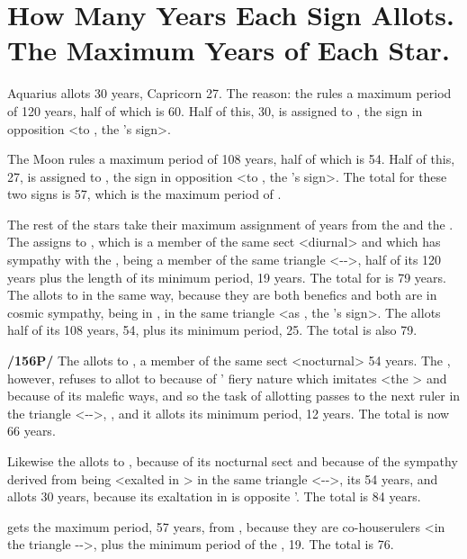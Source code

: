 \section{How Many Years Each Sign Allots. The Maximum Years of Each Star.}

Aquarius allots 30 years, Capricorn 27. The reason: the \Sun\xspace rules a maximum period of 120 years,
half of which is 60. Half of this, 30, is assigned to \Aquarius, the sign in opposition <to \Leo, the \Sun’s
sign>. 

The Moon rules a maximum period of 108 years, half of which is 54. Half of this, 27, is assigned to \Capricorn, the sign in opposition <to \Cancer, the \Moon’s sign>. The total for these two signs is 57, which is the maximum period of \Saturn.

The rest of the stars take their maximum assignment of years from the \Sun\xspace and the \Moon. The \Sun\xspace assigns to \Jupiter, which is a member of the same sect <diurnal> and which has sympathy with the \Sun, being a member of the same triangle <\Leo-\Sagittarius-\Aries>, half of its 120 years plus the length of its minimum period, 19 years. The total for \Jupiter\xspace is 79 years. The \Moon\xspace allots to \Jupiter\xspace in the same way, because they are both benefics and both are in cosmic sympathy, \Jupiter\xspace being in \Pisces, in the same triangle <as \Cancer, the \Moon’s sign>. The \Moon\xspace allots half of its 108 years, 54, plus its minimum period, 25. The total is also 79.

\textbf{/156P/} The \Moon\xspace allots to \Mars, a member of the same sect <nocturnal> 54 years. The \Sun, however,
refuses to allot to \Mars\xspace because of \Mars’ fiery nature which imitates <the \Sun> and because of its malefic
ways, and so the task of allotting passes to the next ruler in the triangle <\Leo-\Sagittarius-\Aries>, \Jupiter, and it allots its minimum period, 12 years. The total is now 66 years.

Likewise the \Moon\xspace allots to \Venus, because of its nocturnal sect and because of the sympathy derived from being <exalted in \Pisces> in the same triangle <\Cancer-\Pisces-\Scorpio>, its 54 years, and \Saturn\xspace allots 30 years, because its exaltation in \Libra\xspace is opposite \Venus’. The total is 84 years.

\Mercury\xspace gets the maximum period, 57 years, from \Saturn, because they are co-houserulers <in the triangle \Virgo-\Capricorn-\Taurus>, plus the minimum period of the \Sun, 19. The total is 76.

\newpage